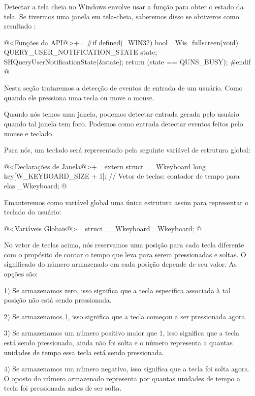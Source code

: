 Detectar a tela cheia no Windows envolve usar a
função  para obter o estado
da tela. Se tivermos uma janela em tela-cheia, saberemos disso se
obtiveros como resultado :

\iniciocodigo
@<Funções da API@>+=
#if defined(_WIN32)
bool _Wis_fullscreen(void){
  QUERY_USER_NOTIFICATION_STATE state;
  SHQueryUserNotificationState(&state);
  return (state == QUNS_BUSY);
}
#endif
@



Nesta seção trataremos a detecção de eventos de entrada de um
usuário. Como quando ele pressiona uma tecla ou move o mouse.


Quando nós temos uma janela, podemos detectar entrada gerada pelo
usuário quando tal janela tem foco. Podemos como entrada detectar
eventos feitos pelo mouse e teclado.

Para nós, um teclado será representado pela seguinte variável de
estrutura global:

\iniciocodigo
@<Declarações de Janela@>+=
extern struct __Wkeyboard{
  long key[W_KEYBOARD_SIZE + 1]; // Vetor de teclas: contador de tempo para elas
} _Wkeyboard;
@
\fimcodigo

Emanteremos como variável global uma única estrutura assim para
representar o teclado do usuário:

\iniciocodigo
@<Variáveis Globais@>=
struct __Wkeyboard _Wkeyboard;
@
\fimcodigo


No vetor de teclas acima, nós reservamos uma posição para cada tecla
diferente com o propósito de contar o tempo que leva para serem
pressionadas e soltas. O significado do número armazenado em cada
posição depende de seu valor. As opções são:

1) Se armazenamos zero, isso significa que a tecla específica
associada à tal posição não está sendo pressionada.

2) Se armazenamos 1, isso significa que a tecla começou a ser
pressionada agora.

3) Se armazenamos um número positivo maior que 1, isso significa que a
tecla está sendo pressionada, ainda não foi solta e o número
representa a quantas unidades de tempo essa tecla está sendo
pressionada.

4) Se armazenamos um número negativo, isso significa que a tecla foi
solta agora. O oposto do número armazenado representa por quantas
unidades de tempo a tecla foi pressionada antes de ser solta.


